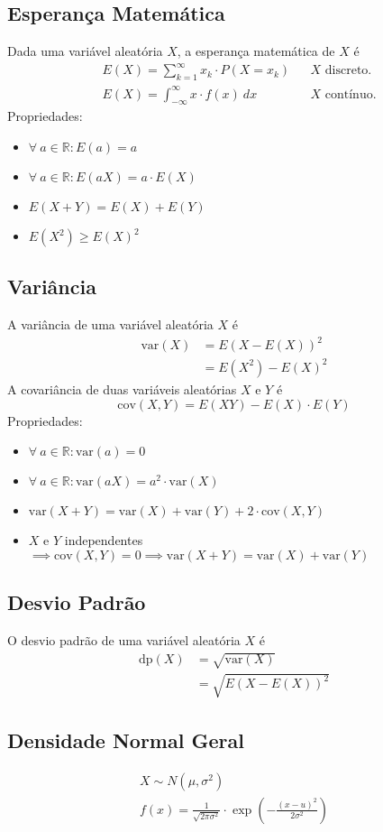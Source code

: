 \documentclass{article}
\begin{document}
\pagebreak

\subsection{Esperança Matemática}
Dada uma variável aleatória $X$, a esperança matemática de $X$ é
\begin{align*}
  & E(X) = \sum_{k=1}^{\infty} x_k \cdot P(X = x_k) && \text{$X$ discreto.} \\[5pt]
  & E(X) = \int_{-\infty}^{\infty} x \cdot f(x) \: dx && \text{$X$ contínuo.}
\end{align*}
Propriedades:
\begin{itemize}
  \item $\forall\: a \in \mathbb{R}: E(a) = a$
  \item $\forall\: a \in \mathbb{R}: E(aX) = a \cdot E(X)$
  \item $E(X + Y) = E(X) + E(Y)$
  \item $E(X^2) \geq {E(X)}^2$
\end{itemize}

\subsection{Variância}
A variância de uma variável aleatória $X$ é
\begin{align*}
  \text{var}(X) & = {E(X - E(X))}^2 \\
  & = E(X^2) - {E(X)}^2
\end{align*}
A covariância de duas variáveis aleatórias $X$ e $Y$ é
\[ \text{cov}(X, Y) = E(XY) - E(X) \cdot E(Y) \]
Propriedades:
\begin{itemize}
  \item $\forall\: a \in \mathbb{R}: \text{var}(a) = 0$
  \item $\forall\: a \in \mathbb{R}: \text{var}(aX) = a^2 \cdot \text{var}(X)$
  \item $\text{var}(X + Y) = \text{var}(X) + \text{var}(Y) + 2 \cdot \text{cov}(X, Y)$
  \item $X$ e $Y$ independentes $\implies \text{cov}(X,Y) = 0 \implies \text{var}(X + Y) = \text{var}(X) + \text{var}(Y)$
\end{itemize}

\subsection{Desvio Padrão}
O desvio padrão de uma variável aleatória $X$ é
\begin{align*}
  \text{dp}(X) & = \sqrt{\text{var}(X)} \\
  & = \sqrt{{E(X - E(X))}^2}
\end{align*}

\pagebreak

\subsection{Densidade Normal Geral}
\begin{gather*}
  X \sim N(\mu, \sigma^2) \\[5pt]
  f(x) = \frac{1}{\sqrt{2 \pi \sigma^2}} \cdot \exp \left(- \frac{{(x - u)}^2}{2\sigma^2} \right)
\end{gather*}
\end{document}
